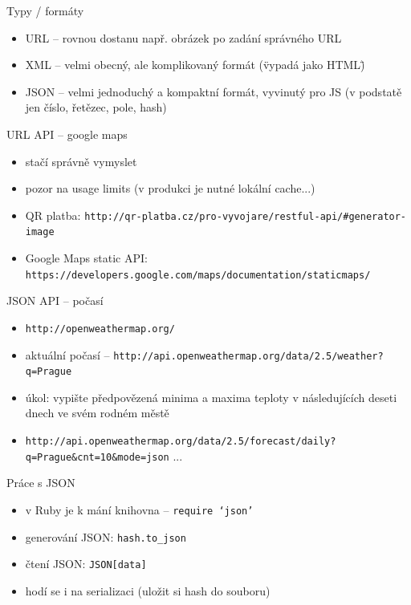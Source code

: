 \documentclass{beamer}
\begin{document}
\begin{frame}{Typy / formáty}
  \begin{itemize}
    \item URL -- rovnou dostanu např. obrázek po zadání správného URL
    \item XML -- velmi obecný, ale komplikovaný formát (\"vypadá jako HTML\")
    \item JSON -- velmi jednoduchý a kompaktní formát, vyvinutý pro JS (v podstatě jen číslo, řetězec, pole, hash)
  \end{itemize}
\end{frame}


\begin{frame}{URL API -- google maps}
  \begin{itemize}
    \item stačí správně vymyslet 
    \item pozor na usage limits (v produkci je nutné lokální cache...) 
    \item QR platba: \texttt{http://qr-platba.cz/pro-vyvojare/restful-api/\#generator-image}
    \item Google Maps static API: \texttt{https://developers.google.com/maps/documentation/staticmaps/}
  \end{itemize}
\end{frame}


\begin{frame}{JSON API -- počasí}
  \begin{itemize}
    \item \texttt{http://openweathermap.org/}
    \item aktuální počasí -- \texttt{http://api.openweathermap.org/data/2.5/weather?q=Prague}
    \item úkol: vypište předpovězená minima a maxima teploty v následujících deseti dnech ve svém rodném městě
    \item \texttt{http://api.openweathermap.org/data/2.5/forecast/daily?q=Prague\&cnt=10\&mode=json} ...
  \end{itemize}
\end{frame}

\begin{frame}{Práce s JSON}
  \begin{itemize}
    \item v Ruby je k mání knihovna -- \texttt{require `json'}
    \item generování JSON: \texttt{hash.to\_json}
    \item čtení JSON: \texttt{JSON[data]}
    \item hodí se i na serializaci (uložit si hash do souboru) 
  \end{itemize}
\end{frame}
\end{document}
